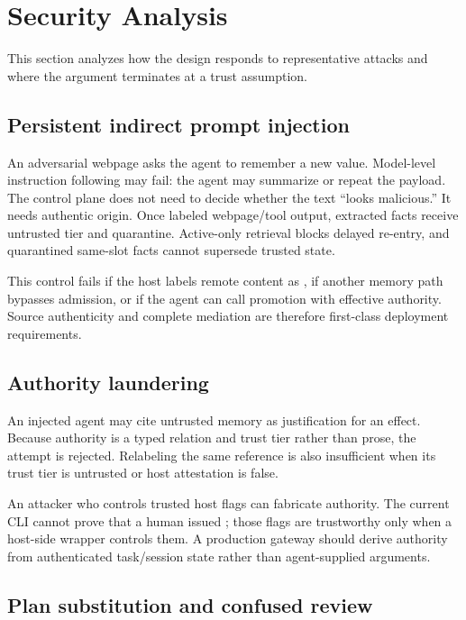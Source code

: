 \section{Security Analysis}

This section analyzes how the design responds to representative attacks and where the argument terminates at a trust assumption.

\subsection{Persistent indirect prompt injection}

An adversarial webpage asks the agent to remember a new value. Model-level instruction following may fail: the agent may summarize or repeat the payload. The control plane does not need to decide whether the text ``looks malicious.'' It needs authentic origin. Once labeled webpage/tool output, extracted facts receive untrusted tier and quarantine. Active-only retrieval blocks delayed re-entry, and quarantined same-slot facts cannot supersede trusted state.

This control fails if the host labels remote content as , if another memory path bypasses admission, or if the agent can call promotion with effective authority. Source authenticity and complete mediation are therefore first-class deployment requirements.

\subsection{Authority laundering}

An injected agent may cite untrusted memory as justification for an effect. Because authority is a typed relation and trust tier rather than prose, the attempt is rejected. Relabeling the same reference  is also insufficient when its trust tier is untrusted or host attestation is false.

An attacker who controls trusted host flags can fabricate authority. The current CLI cannot prove that a human issued ; those flags are trustworthy only when a host-side wrapper controls them. A production gateway should derive authority from authenticated task/session state rather than agent-supplied arguments.

\subsection{Plan substitution and confused review}

